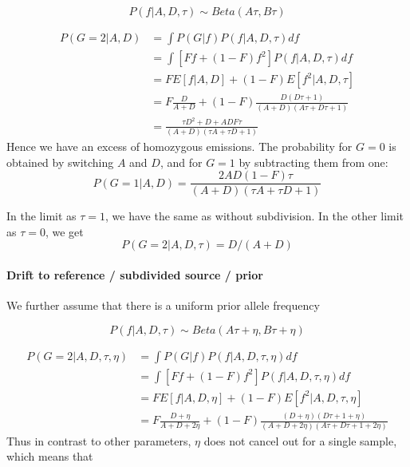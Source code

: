 \documentclass[10pt,a4paper]{article}
\begin{document}
$$P(f| A, D, \tau) \sim Beta (A\tau, B\tau)$$

\begin{align}
P(G=2 | A,D) &= \int P(G|f) P(f | A, D, \tau) df\nonumber\\
&= \int \left[ F f + (1-F) f^2\right] P(f | A, D, \tau) df\nonumber\\
&= F E[f|A, D] + (1-F)  E[f^2|A, D, \tau]\nonumber\\
&= F \frac{D}{A+D} + (1-F)  \frac{D (D\tau+1)}{(A+D)(A\tau+D\tau+1)}\nonumber\\
&= \frac{\tau D^2 + D + ADF\tau}{(A+D)(\tau A+\tau D+1)}
\end{align}
Hence we have an excess of homozygous emissions. The probability for $G=0$ is obtained by switching $A$ and $D$, and for $G=1$ by subtracting them from one:
\begin{equation}
P(G=1 | A,D) = \frac{2AD(1-F)\tau}{(A+D)(\tau A+\tau D+1)}
\end{equation} 

In the limit as $\tau=1$, we have the same as without subdivision. In the 
other limit as $\tau=0$, we get
\begin{equation}
P(G=2|A, D, \tau) = D / (A+D)
\end{equation}

\paragraph{Drift to reference / subdivided source / prior}
We further assume that there is a uniform prior allele frequency

$$P(f| A, D, \tau) \sim Beta (A\tau + \eta, B\tau + \eta)$$

\begin{align}
P(G=2 | A,D, \tau, \eta) &= \int P(G|f) P(f | A, D, \tau, \eta) df\nonumber\\
&= \int \left[ F f + (1-F) f^2\right] P(f | A, D, \tau, \eta) df\nonumber\\
&= F E[f|A, D, \eta] + (1-F)  E[f^2|A, D, \tau, \eta]\nonumber\\
&= F \frac{D + \eta}{A+D + 2\eta} + (1-F)  \frac{(D+\eta) (D\tau+1 + \eta)}{(A+D + 2\eta)(A\tau+D\tau+1+2\eta)}\nonumber
\end{align}
Thus in contrast to other parameters, $\eta$ does not cancel out for a single sample, which means that 
\end{document}
